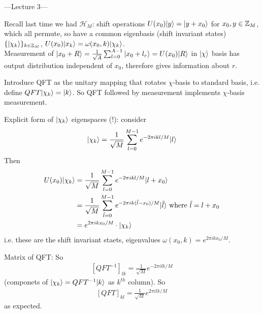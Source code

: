 \documentclass[a4paper]{article}
\begin{document}
---Lecture 3---



Recall last time we had $\mathcal{H}_M$: shift operations $U(x_0) |y \rangle = |y+x_0\rangle$ for $x_0,y \in \mathbb{Z}_M$, which all permute, so have a common eigenbasis (shift invariant states) $\{|\chi_k\rangle \}_{k \in \mathbb{Z}_M}$, $U(x_0) | x_k\rangle = \omega(x_0,k) |\chi_k\rangle$.\\
Measurement of $|x_0+R \rangle = \frac{1}{\sqrt{A}} \sum_{l=0}^{A-1} |x_0 + l_r \rangle = U(x_0) |R\rangle$ in $|\chi\rangle$ basis has output distribution independent of $x_0$, therefore gives information about $r$.

Introduce QFT as the unitary mapping that rotates $\chi$-basis to standard basis, i.e. define $QFT|\chi_k \rangle = |k\rangle$. So QFT followed by measurement implements $\chi$-basis measurement.

Explicit form of $|\chi_k\rangle$ eigenspaces (!): consider
\begin{equation*}
    \begin{aligned}
        |\chi_k\rangle = \frac{1}{\sqrt{M}}\sum_{l=0}^{M-1} e^{-2\pi i kl/M}|l\rangle
    \end{aligned}
\end{equation*}
Then
\begin{equation*}
    \begin{aligned}
        U(x_0) |\chi_k \rangle &= \frac{1}{\sqrt{M}} \sum_{l=0}^{M-1} e^{-2\pi i kl/M}|l+x_0\rangle \\
        &= \frac{1}{\sqrt{M}} \sum_{\tilde{l}=0}^{M-1} e^{-2\pi i k (\tilde{l}-x_0)/M} | \tilde{l} \rangle \text { where } \tilde{l} = l+x_0\\
        &= e^{2\pi i k x_0 / M} \cdot |\chi_k\rangle
    \end{aligned}
\end{equation*}
i.e. these are the shift invariant staets, eigenvalues $\omega(x_0,k) = e^{2\pi i k x_0/M}$.

Matrix of QFT: So
\begin{equation*}
    \begin{aligned}
        [QFT^{-1}]_{lk} = \frac{1}{\sqrt{M}} e^{-2\pi i lk/M}
    \end{aligned}
\end{equation*}
(componets of $|\chi_k \rangle = QFT^{-1} |k\rangle$ as $k^{th}$ column). So
\begin{equation*}
    \begin{aligned}
        [QFT]_{kl} = \frac{1}{\sqrt{M}} e^{2\pi i lk / M}
    \end{aligned}
\end{equation*}
as expected.
\end{document}
